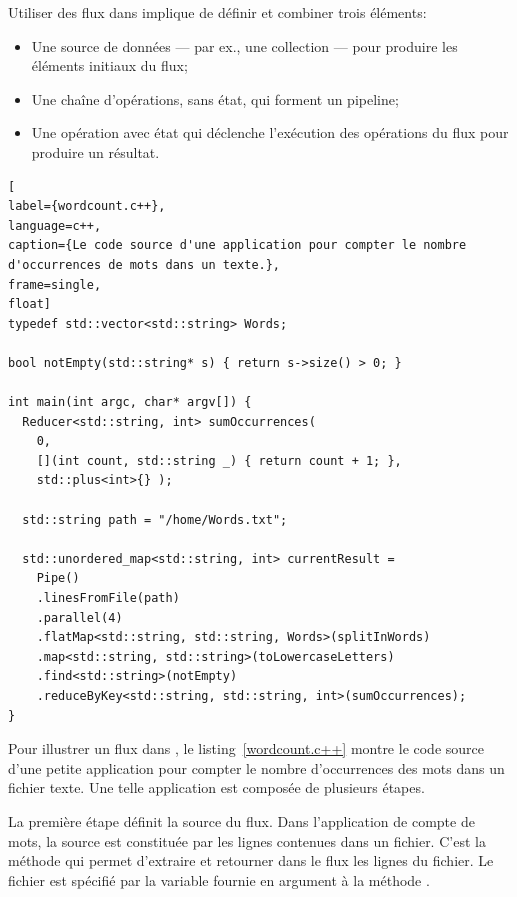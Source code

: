 Utiliser des flux dans \PpFf{} implique de d\'efinir et combiner trois \'el\'ements: 
\begin{itemize}
	\item Une source de donn\'ees --- par ex., une collection --- pour produire les \'el\'ements initiaux du flux;

	\item Une cha\^ine d'op\'erations, sans \'etat, qui forment un pipeline;

	\item Une op\'eration avec \'etat qui d\'eclenche l'ex\'ecution des op\'erations du flux pour produire un r\'esultat.
\end{itemize}


\begin{lstlisting}[
label={wordcount.c++},
language=c++,
caption={Le code source d'une application pour compter le nombre d'occurrences de mots dans un texte.},
frame=single,
float]
typedef std::vector<std::string> Words;

bool notEmpty(std::string* s) { return s->size() > 0; }

int main(int argc, char* argv[]) {
  Reducer<std::string, int> sumOccurrences(
    0, 
    [](int count, std::string _) { return count + 1; },
    std::plus<int>{} );

  std::string path = "/home/Words.txt"; 

  std::unordered_map<std::string, int> currentResult = 
	Pipe()
    .linesFromFile(path) 
    .parallel(4)
    .flatMap<std::string, std::string, Words>(splitInWords)
    .map<std::string, std::string>(toLowercaseLetters)
    .find<std::string>(notEmpty)
    .reduceByKey<std::string, std::string, int>(sumOccurrences);
}
\end{lstlisting}




Pour illustrer un flux dans \PpFf, le listing~\ref{wordcount.c++} montre le code source d'une petite application pour compter le nombre d'occurrences des mots dans un fichier texte. Une telle application est compos\'ee de plusieurs \'etapes. 

La premi\`ere \'etape d\'efinit la source du flux. Dans l'application de compte de mots, la source est constitu\'ee par les lignes contenues dans un fichier. C'est la m\'ethode  qui permet d'extraire et retourner dans le flux les lignes du fichier. Le fichier est sp\'ecifi\'e par la variable  fournie en argument \`a la m\'ethode . 

